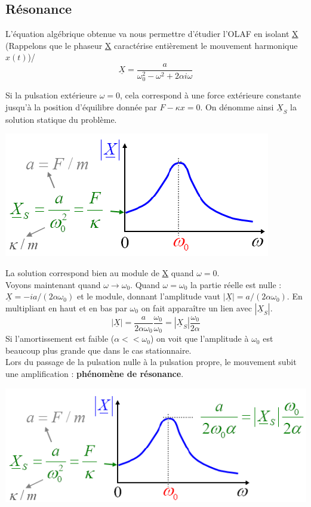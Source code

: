 \documentclass	[11pt, a4paper, openany]{book}
\begin{document}
\subsection{Résonance}
L'équation algébrique obtenue va nous permettre d'étudier l'OLAF en isolant \underline{X} (Rappelons que le phaseur \underline{X} caractérise entièrement le mouvement harmonique $x(t)$)/
\begin{equation}
\underline{X} = \frac{a}{\omega_0^2 - \omega^2 + 2\alpha i\omega}
\end{equation}

Si la pulsation extérieure $\omega = 0$, cela correspond à une force extérieure constante jusqu'à la position d'équilibre donnée par $F - \kappa x = 0$. On dénomme ainsi $\underline{X}_S$ la solution statique  du problème.
\begin{center}
\includegraphics[scale=0.65]{oo/image15.png}
\end{center}
La solution correspond bien au module de \underline{X} quand $\omega = 0$.\\

Voyons maintenant quand $\omega \rightarrow \omega_0$. Quand $\omega = \omega_0$ la partie réelle est nulle : $\underline{X} = -ia/(2\alpha\omega_0)$ et le module, donnant l'amplitude vaut $|\underline{X}| = a/(2\alpha\omega_0)$. En multipliant en haut et en bas par $\omega_0$ on fait apparaître un lien avec $|\underline{X}_S|$.
\begin{equation}
|\underline{X}| = \frac{a}{2\alpha\omega_0}\frac{\omega_0}{\omega_0} = |\underline{X}_S|\frac{\omega_0}{2\alpha}
\end{equation}
Si l'amortissement est faible ($\alpha << \omega_0$) on voit que l'amplitude à $\omega_0$ est beaucoup plus grande que dans le cas stationnaire.\\
Lors du passage de la pulsation nulle à la pulsation propre, le mouvement subit une amplification : \textbf{phénomène de résonance}.
\begin{center}
\includegraphics[scale=0.65]{oo/image16.png}
\end{center}
\end{document}
